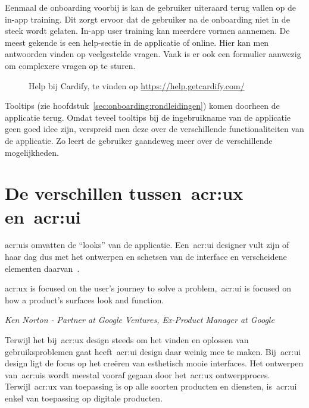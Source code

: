 Eenmaal de onboarding voorbij is kan de gebruiker uiteraard terug vallen op de in-app training. Dit zorgt ervoor dat de gebruiker na de onboarding niet in de steek wordt gelaten. In-app user training kan meerdere vormen aannemen. De meest gekende is een help-sectie in de applicatie of online. Hier kan men antwoorden vinden op veelgestelde vragen. Vaak is er ook een formulier aanwezig om complexere vragen op te sturen.

\begin{figure}
    \centering
    \qquad
    \caption[Voorbeeld help-sectie]{Help bij Cardify, te vinden op \url{https://help.getcardify.com/}}
    \label{fig:inapptraining:help}
\end{figure}

Tooltips (zie hoofdstuk~\ref{sec:onboarding:rondleidingen}) komen doorheen de applicatie terug. Omdat teveel tooltips bij de ingebruikname van de applicatie geen goed idee zijn, verspreid men deze over de verschillende functionaliteiten van de applicatie. Zo leert de gebruiker gaandeweg meer over de verschillende mogelijkheden.

\section{De verschillen tussen~\acrshort{acr:ux} en~\acrshort{acr:ui}}
\label{sec:ux-vs-ui}

\Glspl{acr:ui} omvatten de ``looks'' van de applicatie. Een~\acrshort{acr:ui} designer vult zijn of haar dag dus met het ontwerpen en schetsen van de interface en verscheidene elementen daarvan~\autocite{Lamprecht2019}.

\epigraph{\acrshort{acr:ux} is focused on the user’s journey to solve a problem,~\acrshort{acr:ui} is focused on how a product’s surfaces look and function.}{\textit{Ken Norton - Partner at Google Ventures, Ex-Product Manager at Google}}

Terwijl het bij~\acrshort{acr:ux} design steeds om het vinden en oplossen van gebruiksproblemen gaat heeft~\acrshort{acr:ui} design daar weinig mee te maken. Bij~\acrshort{acr:ui} design ligt de focus op het creëren van esthetisch mooie interfaces. Het ontwerpen van~\glspl{acr:ui} wordt meestal vooraf gegaan door het~\acrshort{acr:ux} ontwerpproces. Terwijl~\acrshort{acr:ux} van toepassing is op alle soorten producten en diensten, is~\acrshort{acr:ui} enkel van toepassing op digitale producten.

